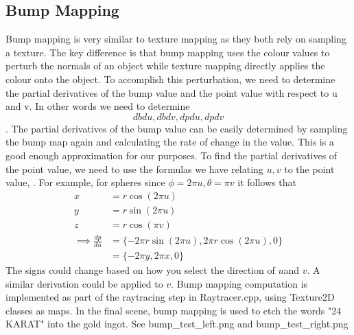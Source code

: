 \documentclass {article}
\begin{document}
\subsection{Bump Mapping}
Bump mapping is very similar to texture mapping as they both rely on sampling a texture. The key
difference is that bump mapping uses the colour values to perturb the normals of an object while texture mapping
directly applies the colour onto the object. To accomplish this perturbation, we need to determine
the partial derivatives of the bump value and the point value with respect to u and v. In other words
we need to determine $$dbdu, dbdv, dpdu,dpdv$$.
The partial derivatives of the bump value can be easily determined by sampling the bump map again and
calculating the rate of change in the value. This is a good enough approximation for our purposes. To find
the partial derivatives of the point value, we need to use the formulas we have relating $u,v$ to the
point value, \cite{PBR}. For example, for spheres since $\phi=2\pi u, \theta=\pi v$ it 
follows that 
\begin{align*}
    x&=r\cos(2\pi u)\\
    y&=r\sin (2\pi u)\\
    z&=r\cos(\pi v)\\
    \implies \frac{dp}{du}&=\{-2\pi r\sin (2\pi u), 2\pi r\cos(2\pi u), 0\}\\
    &=\{-2\pi y, 2\pi x, 0\}
\end{align*}
The signs could change based on how you select the direction of $u $and $v$. A similar derivation
could be applied to $v$. Bump mapping computation is implemented as part of the raytracing step
in Raytracer.cpp, using Texture2D classes as maps. In the final scene, bump mapping is used to etch
the words "24 KARAT" into the gold ingot. See bump\_test\_left.png and bump\_test\_right.png
\end{document}
